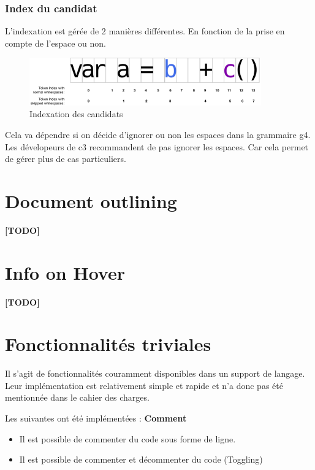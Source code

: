 \documentclass[
    iict, %
    il, %
]{heig-tb}
\begin{document}
\subsubsection{Index du candidat}
L'indexation est gérée de 2 manières différentes. En fonction de la prise en compte de l'espace ou non.

\begin{figure}[!ht]
    \begin{center}
        \includegraphics[width=10cm]{assets/figures/candidat-index.png}
    \end{center}
    \caption[Indexation des candidats]{\label{candidat-index} Indexation des candidats}
\end{figure}

Cela va dépendre si on décide d'ignorer ou non les espaces dans la grammaire g4.
Les dévelopeurs de c3 recommandent de pas ignorer les espaces. Car cela permet de gérer plus de cas particuliers.

\section{Document outlining}
\textbf{[TODO]}

\section{Info on Hover}
\textbf{[TODO]}

\section{Fonctionnalités triviales}
Il s'agit de fonctionnalités couramment disponibles dans un support de langage. Leur implémentation est relativement simple et rapide et n'a donc pas été mentionnée dans le cahier des charges.

Les suivantes ont été implémentées :
\textbf{Comment}
\begin{itemize}
    \item Il est possible de commenter du code sous forme de ligne.
    \item Il est possible de commenter et décommenter du code (Toggling)
\end{itemize}
\end{document}
